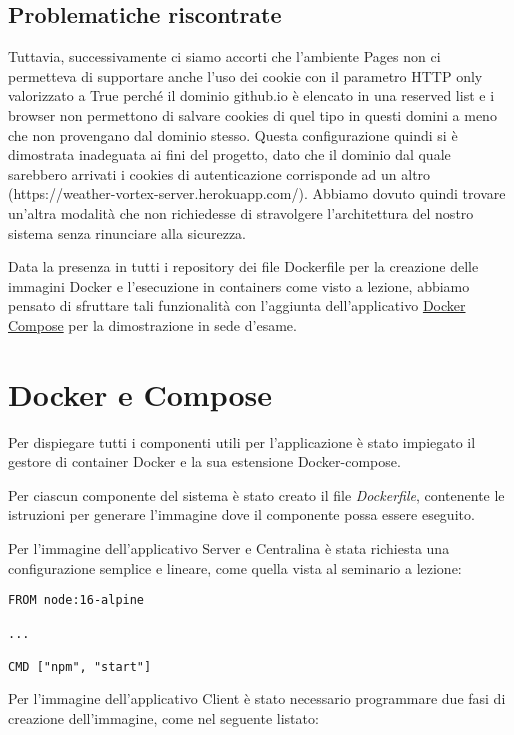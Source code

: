 \subsection{Problematiche riscontrate}

Tuttavia, successivamente ci siamo accorti che l'ambiente Pages non ci permetteva di supportare anche l'uso dei cookie con il parametro HTTP only valorizzato a True perché il dominio github.io è elencato in una reserved list e i browser non permettono di salvare cookies di quel tipo in questi domini a meno che non provengano dal dominio stesso. Questa configurazione quindi si è dimostrata inadeguata ai fini del progetto, dato che il dominio dal quale sarebbero arrivati i cookies di autenticazione corrisponde ad un altro (https://weather-vortex-server.herokuapp.com/). Abbiamo dovuto quindi trovare un'altra modalità che non richiedesse di stravolgere l'architettura del nostro sistema senza rinunciare alla sicurezza.

Data la presenza in tutti i repository dei file Dockerfile per la creazione delle immagini Docker e l'esecuzione in containers come visto a lezione, abbiamo pensato di sfruttare tali funzionalità con l'aggiunta dell'applicativo \href{https://docs.docker.com/compose/}{Docker Compose} per la dimostrazione in sede d'esame.

\section{Docker e Compose}
Per dispiegare tutti i componenti utili per l’applicazione è stato impiegato il
gestore di container Docker e la sua estensione Docker-compose.

Per ciascun componente del sistema è stato creato il file \textit{Dockerfile}, contenente le istruzioni per generare l’immagine dove il componente possa essere eseguito. 

Per l'immagine dell'applicativo Server e Centralina è stata richiesta una configurazione semplice e lineare, come quella vista al seminario a lezione:

\begin{lstlisting}
FROM node:16-alpine

...

CMD ["npm", "start"]

\end{lstlisting}

Per l'immagine dell'applicativo Client è stato necessario programmare due fasi di creazione dell'immagine, come nel seguente listato:

